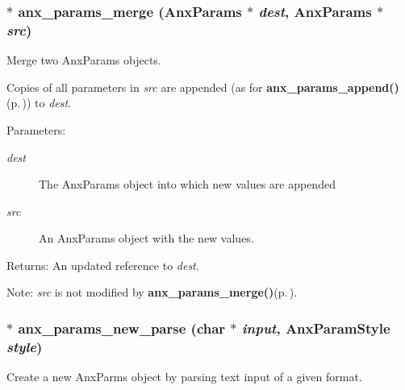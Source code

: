 \subsubsection{$\ast$ anx\_\-params\_\-merge ({\bf Anx\-Params} $\ast$ {\em dest}, {\bf Anx\-Params} $\ast$ {\em src})}\label{anx__params_8h_a11}


Merge two Anx\-Params objects. 

Copies of all parameters in {\em src\/} are appended (as for {\bf anx\_\-params\_\-append()}{\rm (p.\,\pageref{anx__params_8h_a9})}) to {\em dest\/}. \begin{Desc}
\item[Parameters:]
\begin{description}
\item[{\em dest}]The Anx\-Params object into which new values are appended \item[{\em src}]An Anx\-Params object with the new values. \end{description}
\end{Desc}
\begin{Desc}
\item[Returns:]An updated reference to {\em dest\/}. \end{Desc}
\begin{Desc}
\item[Note:]{\em src\/} is not modified by {\bf anx\_\-params\_\-merge()}{\rm (p.\,\pageref{anx__params_8h_a11})}. \end{Desc}
\subsubsection{$\ast$ anx\_\-params\_\-new\_\-parse (char $\ast$ {\em input}, {\bf Anx\-Param\-Style} {\em style})}\label{anx__params_8h_a5}


Create a new Anx\-Parms object by parsing text input of a given format. 

